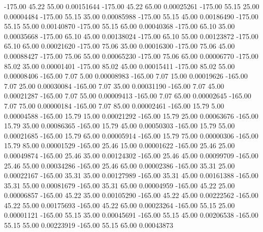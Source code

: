    -175.00     45.22     55.00     0.00151644
   -175.00     45.22     65.00     0.00025261
   -175.00     55.15     25.00     0.00004484
   -175.00     55.15     35.00     0.00085988
   -175.00     55.15     45.00     0.00186490
   -175.00     55.15     55.00     0.00140870
   -175.00     55.15     65.00     0.00040368
   -175.00     65.10     35.00     0.00035668
   -175.00     65.10     45.00     0.00138024
   -175.00     65.10     55.00     0.00123872
   -175.00     65.10     65.00     0.00021620
   -175.00     75.06     35.00     0.00016300
   -175.00     75.06     45.00     0.00088427
   -175.00     75.06     55.00     0.00065230
   -175.00     75.06     65.00     0.00006770
   -175.00     85.02     35.00     0.00001401
   -175.00     85.02     45.00     0.00015411
   -175.00     85.02     55.00     0.00008406
   -165.00      7.07      5.00     0.00008983
   -165.00      7.07     15.00     0.00019626
   -165.00      7.07     25.00     0.00030084
   -165.00      7.07     35.00     0.00031190
   -165.00      7.07     45.00     0.00021287
   -165.00      7.07     55.00     0.00009413
   -165.00      7.07     65.00     0.00002645
   -165.00      7.07     75.00     0.00000184
   -165.00      7.07     85.00     0.00002461
   -165.00     15.79      5.00     0.00004588
   -165.00     15.79     15.00     0.00021292
   -165.00     15.79     25.00     0.00063676
   -165.00     15.79     35.00     0.00086365
   -165.00     15.79     45.00     0.00050303
   -165.00     15.79     55.00     0.00021685
   -165.00     15.79     65.00     0.00005914
   -165.00     15.79     75.00     0.00000306
   -165.00     15.79     85.00     0.00001529
   -165.00     25.46     15.00     0.00001622
   -165.00     25.46     25.00     0.00049874
   -165.00     25.46     35.00     0.00124302
   -165.00     25.46     45.00     0.00099709
   -165.00     25.46     55.00     0.00034286
   -165.00     25.46     65.00     0.00002386
   -165.00     35.31     25.00     0.00022167
   -165.00     35.31     35.00     0.00127989
   -165.00     35.31     45.00     0.00161388
   -165.00     35.31     55.00     0.00081679
   -165.00     35.31     65.00     0.00004959
   -165.00     45.22     25.00     0.00006857
   -165.00     45.22     35.00     0.00105290
   -165.00     45.22     45.00     0.00222562
   -165.00     45.22     55.00     0.00175693
   -165.00     45.22     65.00     0.00023264
   -165.00     55.15     25.00     0.00001121
   -165.00     55.15     35.00     0.00045691
   -165.00     55.15     45.00     0.00206538
   -165.00     55.15     55.00     0.00223919
   -165.00     55.15     65.00     0.00043873
